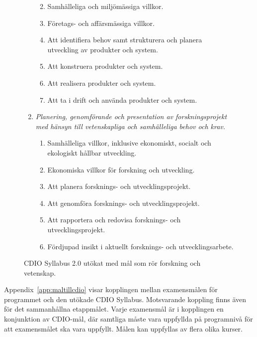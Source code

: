 \begin{figure}[tp]
\begin{tcbframe}
\begin{enumerate}
  \begin{enumerate}
   \def\labelenumii{\arabic{enumi}.\arabic{enumii}.}
  \tightlist
  \item
    Samhälleliga och miljömässiga villkor.
  \item
    Företags- och affärsmässiga villkor.
  \item
    Att identifiera behov samt strukturera och planera utveckling av
    produkter och system.
  \item
    Att konstruera produkter och system.
  \item
    Att realisera produkter och system.
  \item
    Att ta i drift och använda produkter och system.
  \end{enumerate}
\item
  \emph{Planering, genomförande och presentation av forskningsprojekt med
  hänsyn till vetenskapliga och samhälleliga behov och krav.}
  \begin{enumerate}
  \def\labelenumii{\arabic{enumi}.\arabic{enumii}.}
  \tightlist
   \item
    Samhälleliga villkor, inklusive ekonomiskt, socialt och ekologiskt
    hållbar utveckling.
  \item
    Ekonomiska villkor för forskning och utveckling.
  \item
    Att planera forsknings- och utvecklingsprojekt.
  \item
    Att genomföra forsknings- och utvecklingsprojekt.
  \item
    Att rapportera och redovisa forsknings- och utvecklingsprojekt.
  \item
    Fördjupad insikt i aktuellt forsknings- och utvecklingsarbete.
  \end{enumerate}
\end{enumerate}
\end{tcbframe}
\caption{CDIO Syllabus 2.0 utökat med mål som rör forskning och vetenskap.\label{fig:cdiosyll}}
\end{figure}

Appendix~\ref{app:maltillcdio}  visar kopplingen mellan examensmålen för programmet och den utökade CDIO Syllabus. Motsvarande koppling finns även för det sammanhållna etappmålet. Varje examensmål är i kopplingen en konjunktion av CDIO-mål, där samtliga måste vara uppfyllda på programnivå för att examensmålet ska vara uppfyllt. Målen kan uppfyllas av flera olika kurser.

